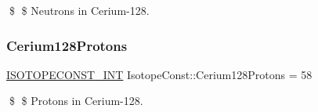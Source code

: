 \$ \$ Neutrons in Cerium-\/128. \mbox{\label{group___isotope_const-_cerium-_ce128_gac87825c4d25452a36bcb79433bed06ce}} 
\subsubsection{\texorpdfstring{Cerium128\+Protons}{Cerium128Protons}}
{\footnotesize\ttfamily \mbox{\hyperlink{group___isotope_const-_macros_ga5f18360b3e99483a35c32d789e62621c}{I\+S\+O\+T\+O\+P\+E\+C\+O\+N\+S\+T\+\_\+\+I\+NT}} Isotope\+Const\+::\+Cerium128\+Protons = 58}

\$ \$ Protons in Cerium-\/128. 